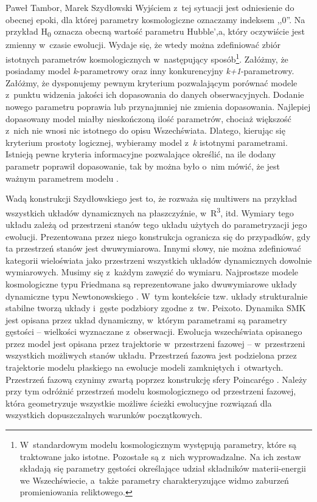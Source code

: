 \begin{artplenv}{Paweł Tambor, Marek Szydłowski}
Wyjściem z~tej sytuacji jest odniesienie do obecnej epoki, dla której parametry kosmologiczne oznaczamy indeksem ,,0''. Na przykład H\textsubscript{0} oznacza obecną wartość parametru Hubble',a, który oczywiście jest zmienny w~czasie ewolucji. Wydaje się, że wtedy można zdefiniować zbiór istotnych parametrów kosmologicznych w~następujący sposób\footnote{W~standardowym modelu kosmologicznym występują parametry, które są traktowane jako istotne. Pozostałe są z~nich wyprowadzalne. Na ich zestaw składają się parametry gęstości określające udział składników materii-energii we Wszechświecie, a~także parametry charakteryzujące widmo zaburzeń promieniowania reliktowego.}. Załóżmy, że posiadamy model \textit{k}-parametrowy oraz inny konkurencyjny \textit{k+1}-parametrowy. Załóżmy, że dysponujemy pewnym kryterium pozwalającym porównać modele z~punktu widzenia jakości ich dopasowania do danych obserwacyjnych. Dodanie nowego parametru poprawia lub przynajmniej nie zmienia dopasowania. Najlepiej dopasowany model miałby nieskończoną ilość parametrów, chociaż większość z~nich nie wnosi nic istotnego do opisu Wszechświata. Dlatego, kierując się kryterium prostoty logicznej, wybieramy model z~\textit{k} istotnymi parametrami. Istnieją pewne kryteria informacyjne pozwalające określić, na ile dodany parametr poprawił dopasowanie, tak by można było o~nim mówić, że jest ważnym parametrem modelu
\parencite[][]{szydlowski_towards_2007}.%


Wadą konstrukcji Szydłowskiego jest to, że rozważa się multiwers na przykład wszystkich układów dynamicznych na płaszczyźnie, w~R\textsuperscript{3}, itd. Wymiary tego układu zależą od przestrzeni stanów tego układu użytych do parametryzacji jego ewolucji. Prezentowana przez niego konstrukcja ogranicza się do przypadków, gdy ta przestrzeń stanów jest dwuwymiarowa. Innymi słowy, nie można zdefiniować kategorii wieloświata jako przestrzeni wszystkich układów dynamicznych dowolnie wymiarowych. Musimy się z~każdym zawęzić do wymiaru. Najprostsze modele kosmologiczne typu Friedmana są reprezentowane jako dwuwymiarowe układy dynamiczne typu Newtonowskiego
\parencites[][]{szydlowski_towards_2007}[por.][]{szydlowski_filozoficzne_1983}. %
 W~tym kontekście tzw. układy strukturalnie stabilne tworzą układy i~gęste podzbiory zgodne z~tw. Peixoto. Dynamika SMK jest opisana przez układ dynamiczny, w~którym parametrami są parametry gęstości -- wielkości wyznaczane z~obserwacji. Ewolucja wszechświata opisanego przez model jest opisana przez trajektorie w~przestrzeni fazowej -- w~przestrzeni wszystkich możliwych stanów układu. Przestrzeń fazowa jest podzielona przez trajektorie modelu płaskiego na ewolucje modeli zamkniętych i~otwartych. Przestrzeń fazową czynimy zwartą poprzez konstrukcję sfery Poincarégo
\parencite{perko_differential_1996}.
 Należy przy tym odróżnić przestrzeń modelu kosmologicznego od przestrzeni fazowej, która geometryzuje wszystkie możliwe ścieżki ewolucyjne rozwiązań dla wszystkich dopuszczalnych warunków początkowych.


\end{artplenv}
